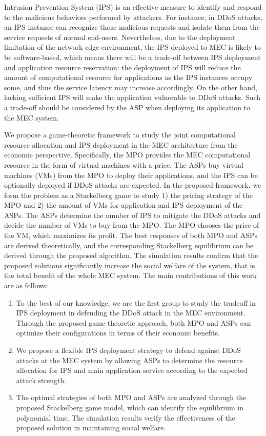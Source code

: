 \documentclass[10pt,journal, compsoc]{IEEEtran}
\begin{document}
Intrusion Prevention System (IPS) is an effective measure to identify and respond to the malicious behaviors performed by attackers\cite{Nadeem}. For instance, in DDoS attacks, an IPS instance can recognize those malicious requests and isolate them from the service requests of normal end-users\cite{Siregar}. Nevertheless, due to the deployment limitation of the network edge environment, the IPS deployed to MEC is likely to be software-based, which means there will be a trade-off between IPS deployment and application resource reservation: the deployment of IPS will reduce the amount of computational resource for applications as the IPS instances occupy some, and thus the service latency may increase accordingly. On the other hand, lacking sufficient IPS will make the application vulnerable to DDoS attacks. Such a trade-off should be considered by the ASP when deploying its application to the MEC system. 

We propose a game-theoretic framework to study the joint computational resource allocation and IPS deployment in the MEC architecture from the economic perspective. Specifically, the MPO provides the MEC computational resource in the form of virtual machines with a price. The ASPs buy virtual machines (VMs) from the MPO to deploy their applications, and the IPS can be optionally deployed if DDoS attacks are expected. In the proposed framework, we form the problem as a Stackelberg game to study 1) the pricing strategy of the MPO and 2) the amount of VMs for application and IPS deployment of the ASPs. The ASPs determine the number of IPS to mitigate the DDoS attacks and decide the number of VMs to buy from the MPO. The MPO chooses the price of the VM, which maximizes its profit. The best responses of both MPO and ASPs are derived theoretically, and the corresponding Stackelberg equilibrium can be derived through the proposed algorithm. The simulation results confirm that the proposed solutions significantly increase the social welfare of the system, that is, the total benefit of the whole MEC system.
The main contributions of this work are as follows:
\begin{enumerate}
    \item To the best of our knowledge, we are the first group to study the tradeoff in IPS deployment in defending the DDoS attack in the MEC environment. Through the proposed game-theoretic approach, both MPO and ASPs can optimize their configurations in terms of their economic benefits.
    \item We propose a flexible IPS deployment strategy to defend against DDoS attacks at the MEC system by allowing ASPs to determine the resource allocation for IPS and main application service according to the expected attack strength. 
    \item The optimal strategies of both MPO and ASPs are analyzed through the proposed Stackelberg game model, which can identify the equilibrium in polynomial time. The simulation results verify the effectiveness of the proposed solution in maintaining social welfare. 
\end{enumerate}
\end{document}

